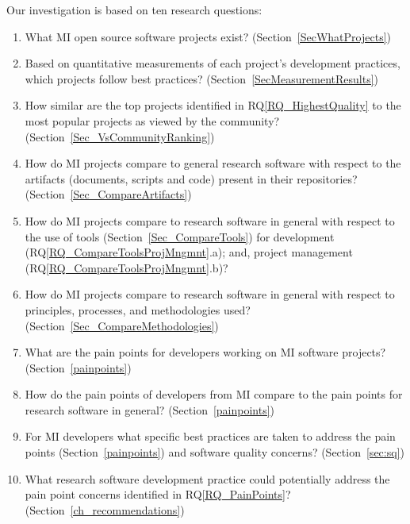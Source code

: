 \documentclass[doubleblind,12pt, 3p, times]{elsarticle}
\newcounter{rqnum} %
\newcommand{\rqref}[1]{RQ\ref{#1}}
\newcounter{qnum} %
\begin{document}
Our investigation is based on ten research questions:
\begin{enumerate}
\item[RQ\refstepcounter{rqnum}\therqnum \label{RQ_WhatProjects}:] What MI
{open source} software projects exist? (Section~\ref{SecWhatProjects})
\item [RQ\refstepcounter{rqnum}\therqnum \label{RQ_HighestQuality}:] Based on
quantitative measurements of each project's development practices, which
projects follow best practices? (Section~\ref{SecMeasurementResults})
\item [RQ\refstepcounter{rqnum}\therqnum \label{RQ_CompareHQ2Popular}:] How
similar are the top projects identified in \rqref{RQ_HighestQuality}
to the most popular projects as viewed by the community?
(Section~\ref{Sec_VsCommunityRanking})
\item [RQ\refstepcounter{rqnum}\therqnum \label{RQ_CompareArtifacts}:] How
do MI projects compare to general research software with respect to the
artifacts (documents, scripts and code) present in their repositories?
(Section~\ref{Sec_CompareArtifacts})
\item [RQ\refstepcounter{rqnum}\therqnum \label{RQ_CompareToolsProjMngmnt}:] How
do MI projects compare to research software in general with respect to the use
of tools (Section~\ref{Sec_CompareTools}) for development
(\rqref{RQ_CompareToolsProjMngmnt}.a); and, project management
(\rqref{RQ_CompareToolsProjMngmnt}.b)?
\item [RQ\refstepcounter{rqnum}\therqnum \label{RQ_CompareMethodologies}:]
How do MI projects compare to research software in general with respect to
principles, processes, and methodologies used?
(Section~\ref{Sec_CompareMethodologies})
\item [RQ\refstepcounter{rqnum}\therqnum \label{RQ_PainPoints}:] What are
the pain points for developers working on MI software projects?
(Section~\ref{painpoints})
\item [RQ\refstepcounter{rqnum}\therqnum \label{RQ_ComparePainPoints}:] How
do the pain points of developers from MI compare to the pain points
for research software in general? (Section~\ref{painpoints})
\item [RQ\refstepcounter{rqnum}\therqnum \label{RQ_Concerns}:] For MI
developers what specific best practices are taken to address the pain points
(Section~\ref{painpoints})
and software quality concerns? (Section~\ref{sec:sq})
\item [RQ\refstepcounter{rqnum}\therqnum \label{RQ_Recommend}:]
What research software development practice could potentially address the
pain point concerns identified in \rqref{RQ_PainPoints}?
(Section~\ref{ch_recommendations})
\end{enumerate}
\end{document}
